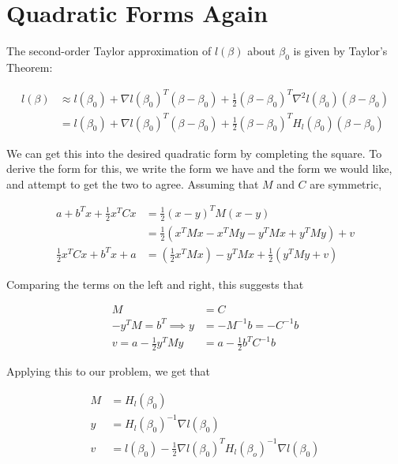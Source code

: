 \documentclass{article}
\begin{document}


\section{Quadratic Forms Again}

The second-order Taylor approximation of $l(\beta)$ about $\beta_0$ is given by
Taylor's Theorem:

\begin{align*}
  l(\beta) &\approx l(\beta_0) + \nabla l(\beta_0)^T (\beta - \beta_0) +
             \frac{1}{2} (\beta - \beta_0)^T  \nabla^2 l(\beta_0) (\beta - \beta_0) \\
           &= l(\beta_0) + \nabla l(\beta_0)^T(\beta - \beta_0) + \frac{1}{2}(\beta - \beta_0)^T
             H_l(\beta_0) (\beta - \beta_0)
\end{align*}

We can get this into the desired quadratic form by completing the square. To
derive the form for this, we write the form we have and the form we would like,
and attempt to get the two to agree. Assuming that $M$ and $C$ are symmetric,

\begin{align*}
  a + b^Tx + \frac{1}{2} x^T C x &= \frac{1}{2} (x - y)^T M (x - y) \\
                                 &= \frac{1}{2} \left(  x^TMx - x^TMy - y^TMx + y^TMy  \right) + v\\
 \frac{1}{2} x^T C x + b^Tx + a &= \left( \frac{1}{2} x^TMx \right) - y^TMx + \frac{1}{2}\left( y^TMy + v \right)
\end{align*}

Comparing the terms on the left and right, this suggests that

\begin{align*}
  M &= C \\
  -y^TM = b^T \implies y &= -M^{-1}b = -C^{-1}b\\
  v = a - \frac{1}{2} y^TMy &= a - \frac{1}{2} b^T C^{-1}b
\end{align*}

Applying this to our problem, we get that

\begin{align*}
  M &= H_l(\beta_0)\\
  y &= H_l(\beta_0)^{-1} \nabla l(\beta_0)\\
  v &= l(\beta_0) - \frac{1}{2} \nabla l(\beta_0)^T H_l(\beta_o)^{-1} \nabla l(\beta_0)
\end{align*}
\end{document}
